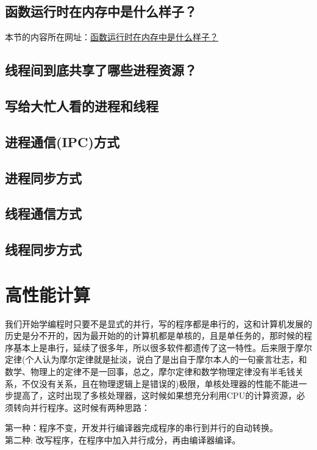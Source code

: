 \documentclass[utf8]{book}
\begin{document}
	
	
	
	\section{函数运行时在内存中是什么样子？}
	本节的内容所在网址：\href{https://mp.weixin.qq.com/s/IRsLkDN4zi0xfWfk2dr-Ug}{函数运行时在内存中是什么样子？}
	
	
	\section{线程间到底共享了哪些进程资源？}
	
	
	\section{写给大忙人看的进程和线程}
	
	\section{进程通信(IPC)方式}
	
	
	\section{进程同步方式}


	\section{线程通信方式}
	\section{线程同步方式}
	
	
	\chapter{高性能计算}
	
	我们开始学编程时只要不是显式的并行，写的程序都是串行的，这和计算机发展的历史是分不开的，因为最开始的的计算机都是单核的，且是单任务的，那时候的程序基本上是串行，延续了很多年，所以很多软件都遗传了这一特性。后来限于摩尔定律(个人认为摩尔定律就是扯淡，说白了是出自于摩尔本人的一句豪言壮志，和数学、物理上的定律不是一回事，总之，摩尔定律和数学物理定律没有半毛钱关系，不仅没有关系，且在物理逻辑上是错误的)极限，单核处理器的性能不能进一步提高了，这时出现了多核处理器，这时候如果想充分利用CPU的计算资源，必须转向并行程序。这时候有两种思路：
	 
	第一种：程序不变，开发并行编译器完成程序的串行到并行的自动转换。\\ \indent
	第二种: 改写程序，在程序中加入并行成分，再由编译器编译。
	
\end{document}
